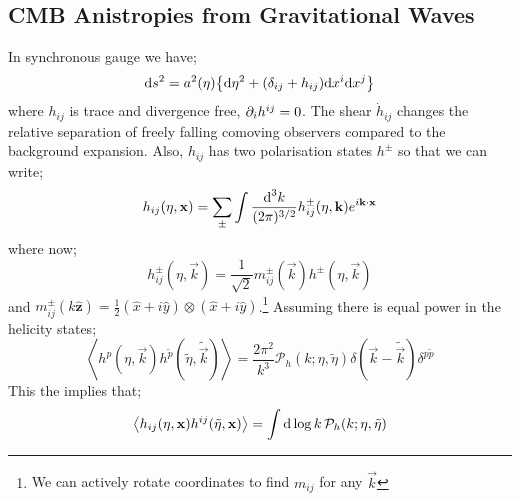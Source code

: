\subsection{CMB Anistropies from Gravitational Waves}
In synchronous gauge we have;
\begin{equation*}
\ud s^2 = a^{2}(\eta) \set{\ud \eta^2 + (\delta_{ij} + h_{ij})\ud x^{i}\ud x^{j}}
\end{equation*}
where $h_{ij}$ is trace and divergence free, $\partial_i h^{ij} = 0$. The shear $\dot{h}_{ij}$ changes the relative separation of freely falling comoving observers compared to the background expansion. Also, $h_{ij}$ has two polarisation states $h^{\pm}$ so that we can write;
\begin{equation}
h_{ij}(\eta, \mathbf{x}) = \sum_{\pm}\int{\frac{\text{d}^3 k}{(2\pi)^{3/2}}h_{ij}^{\pm}(\eta, \mathbf{k})e^{i\mathbf{k}\cdot\mathbf{x}}}
\end{equation}
where now;
\begin{equation*}
h_{ij}^{\pm}(\eta, \vec{k}) = \frac{1}{\sqrt{2}}m_{ij}^{\pm}(\vec{k})h^{\pm}(\eta, \vec{k})
\end{equation*}
and $m_{ij}^{\pm}(k\hat{\bm{z}}) = \tfrac{1}{2}(\hat{x} + i\hat{y})\otimes(\hat{x} + i\hat{y})$.\footnote{We can actively rotate coordinates to find $m_{ij}$ for any $\vec{k}$} Assuming there is equal power in the helicity states;
\begin{equation}
\left< h^{p}(\eta, \vec{k})h^{\tilde{p}}(\tilde{\eta}, \tilde{\vec{k}}) \right> = \frac{2\pi^2}{k^3}\mathcal{P}_h(k;\eta, \tilde{\eta})\delta(\vec{k} - \tilde{\vec{k}})\delta^{p\tilde{p}}
\end{equation}
This the implies that;
\begin{equation}
\left< h_{ij}(\eta, \vec{x})h^{ij}(\tilde{\eta}, \vec{x}) \right> = \int{\upd{\log k}\mathcal{P}_h(k; \eta, \tilde{\eta})}
\end{equation}
